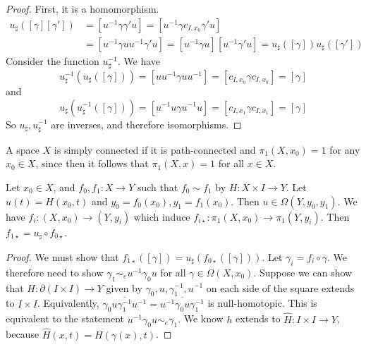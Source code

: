 \begin{proof}
	First, it is a homomorphism.
	\begin{align*}
		u_\sharp([\gamma][\gamma']) &= [u^{-1}\gamma \gamma' u] = [u^{-1}\gamma c_{I,x_0}\gamma' u] \\
		&= [u^{-1}\gamma u u^{-1} \gamma' u] = [u^{-1}\gamma u][u^{-1}\gamma' u] = u_\sharp([\gamma])u_\sharp([\gamma'])
	\end{align*}
	Consider the function \( u^{-1}_\sharp \).
	We have
	\[ u^{-1}_\sharp(u_\sharp([\gamma])) = [uu^{-1}\gamma uu^{-1}] = [c_{I,x_0} \gamma c_{I,x_0}] = [\gamma] \]
	and
	\[ u_\sharp(u^{-1}_\sharp([\gamma])) = [u^{-1}u\gamma u^{-1}u] = [c_{I,x_1} \gamma c_{I,x_1}] = [\gamma] \]
	So \( u_\sharp, u^{-1}_\sharp \) are inverses, and therefore isomorphisms.
\end{proof}
\begin{corollary}
	A space \( X \) is simply connected if it is path-connected and \( \pi_1(X,x_0) = 1 \) for any \( x_0 \in X \), since then it follows that \( \pi_1(X,x) = 1 \) for all \( x \in X \).
\end{corollary}
\begin{theorem}
	Let \( x_0 \in X \), and \( f_0, f_1 \colon X \to Y \) such that \( f_0 \sim f_1 \) by \( H \colon X \times I \to Y \).
	Let \( u(t) = H(x_0,t) \) and \( y_0 = f_0(x_0), y_1 = f_1(x_0) \).
	Then \( u \in \Omega(Y,y_0,y_1) \).
	We have \( f_i \colon (X,x_0) \to (Y,y_i) \) which induce \( f_{i\star} \colon \pi_1(X,x_0) \to \pi_1(Y,y_i) \).
	Then \( f_{1\star} = u_\sharp \circ f_{0\star} \).
	\begin{center}
	\end{center}
\end{theorem}
\begin{proof}
	We must show that \( f_{1\star}([\gamma]) = u_\sharp(f_{0\star}([\gamma])) \).
	Let \( \gamma_i = f_i \circ \gamma \).
	We therefore need to show \( \gamma_1 \sim_e u^{-1} \gamma_0 u \) for all \( \gamma \in \Omega(X,x_0) \).
	Suppose we can show that \( H \colon \partial (I \times I) \to Y \) given by \( \gamma_0, u, \gamma_1^{-1}, u^{-1} \) on each side of the square extends to \( I \times I \).
	Equivalently, \( \overline{\gamma_0 u \gamma_1^{-1} u^{-1}} = \overline{u^{-1}\gamma_0 u \gamma_1^{-1}} \) is null-homotopic.
	This is equivalent to the statement \( u^{-1}\gamma_0 u \sim_e \gamma_1 \).
	We know \( h \) extends to \( \hat H \colon I \times I \to Y \), because \( \hat H(x,t) = H(\gamma(x),t) \).
\end{proof}

